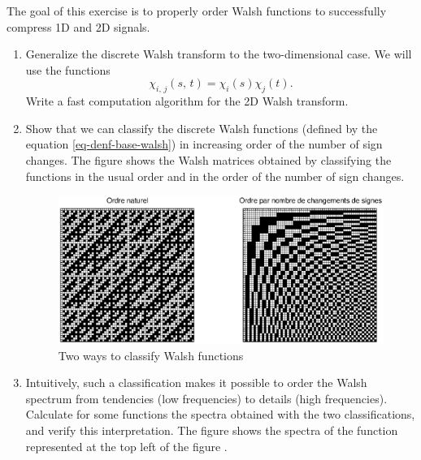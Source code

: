  
\begin{exo}
\label{exo-compression-walsh}
 The goal of this exercise is to properly order Walsh functions to successfully compress 1D and 2D signals. \begin{enumerate}
\item {} Generalize the discrete Walsh transform to the two-dimensional case. We will use the functions
\begin{equation*}
\chi_{i, \, j} (s, \, t) = \chi_i (s) \chi_j (t).
\end{equation*}
Write a fast computation algorithm for the 2D Walsh transform.
\item Show that we can classify the discrete Walsh functions (defined by the equation \eqref{eq-denf-base-walsh}) in increasing order of the number of sign changes. The figure  shows the Walsh matrices obtained by classifying the functions in the usual order and in the order of the number of sign changes. \begin{figure}[ht]
    \begin{center}
    \includegraphics [scale = 0.7]{images/fonctions-walsh.eps}
    \end{center}
    \caption{Two ways to classify Walsh functions}
              \label{fig-functions-walsh}
\end{figure}
 
\item {} Intuitively, such a classification makes it possible to order the Walsh spectrum from tendencies (low frequencies) to details (high frequencies). Calculate for some functions the spectra obtained with the two classifications, and verify this interpretation. The figure  shows the spectra of the function represented at the top left of the figure . 


\end{enumerate}
\end{exo}
